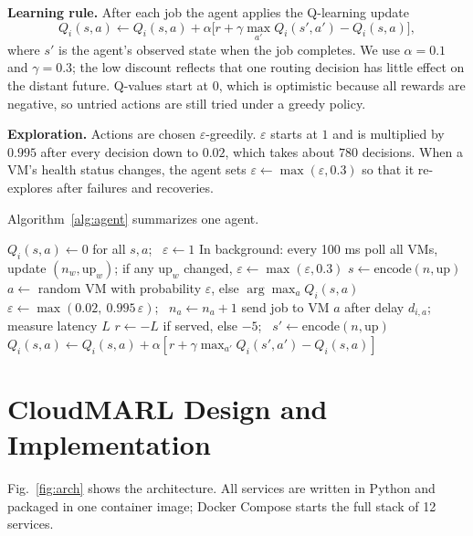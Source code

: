 \documentclass[conference]{IEEEtran}
\begin{document}
\textbf{Learning rule.} After each job the agent applies the Q-learning update~\cite{watkins1992}
\begin{equation}
Q_i(s,a) \leftarrow Q_i(s,a) + \alpha\big[r + \gamma \max_{a'} Q_i(s',a') - Q_i(s,a)\big],
\end{equation}
where $s'$ is the agent's observed state when the job completes. We use $\alpha = 0.1$ and $\gamma = 0.3$; the low discount reflects that one routing decision has little effect on the distant future. Q-values start at $0$, which is optimistic because all rewards are negative, so untried actions are still tried under a greedy policy.

\textbf{Exploration.} Actions are chosen $\varepsilon$-greedily. $\varepsilon$ starts at $1$ and is multiplied by $0.995$ after every decision down to $0.02$, which takes about $780$ decisions. When a VM's health status changes, the agent sets $\varepsilon \leftarrow \max(\varepsilon, 0.3)$ so that it re-explores after failures and recoveries.

Algorithm~\ref{alg:agent} summarizes one agent.

\begin{algorithm}[t]
\caption{Regional load balancer agent $i$}
\label{alg:agent}
\begin{algorithmic}[1]
\State $Q_i(s,a) \gets 0$ for all $s,a$; \ $\varepsilon \gets 1$
\State In background: every 100 ms poll all VMs, update $(n_w, \text{up}_w)$; if any $\text{up}_w$ changed, $\varepsilon \gets \max(\varepsilon, 0.3)$
  \State $s \gets \text{encode}(n, \text{up})$
  \State $a \gets$ random VM with probability $\varepsilon$, else $\arg\max_a Q_i(s,a)$
  \State $\varepsilon \gets \max(0.02,\ 0.995\,\varepsilon)$; \ $n_a \gets n_a + 1$
  \State send job to VM $a$ after delay $d_{i,a}$; measure latency $L$
  \State $r \gets -L$ if served, else $-5$; \ $s' \gets \text{encode}(n, \text{up})$
  \State $Q_i(s,a) \gets Q_i(s,a) + \alpha[r + \gamma\max_{a'}Q_i(s',a') - Q_i(s,a)]$
\EndFor
\end{algorithmic}
\end{algorithm}

\section{CloudMARL Design and Implementation}\label{sec:system}
Fig.~\ref{fig:arch} shows the architecture. All services are written in Python and packaged in one container image; Docker Compose starts the full stack of 12 services.
\end{document}
